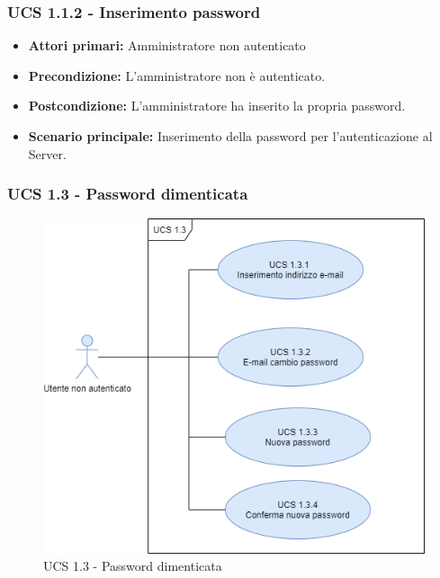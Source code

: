 \subsubsection{UCS 1.1.2 - Inserimento password}%
\begin{itemize}
\item \textbf{Attori primari:} Amministratore non autenticato
\item \textbf{Precondizione:} L'amministratore non è autenticato.
\item \textbf{Postcondizione:} L'amministratore ha inserito la propria password.
\item \textbf{Scenario principale:} Inserimento della password per l'autenticazione al Server.
\end{itemize}



\subsubsection{UCS 1.3 - Password dimenticata}%

\begin{figure}[h]
	\centering
	\includegraphics[scale=0.6]{Sezioni/UseCase/Immagini/UCS1.3.png}
	\caption{UCS 1.3 - Password dimenticata}
\end{figure}

